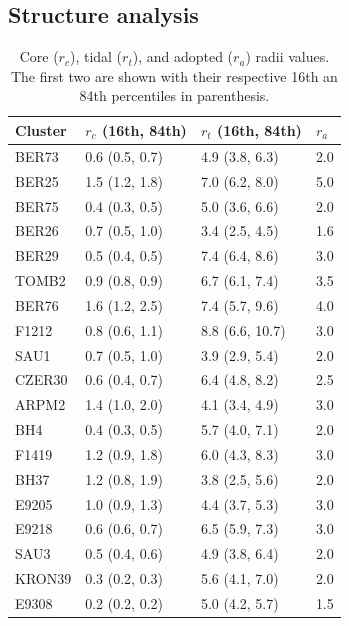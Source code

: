 \documentclass[draft]{aa}
\begin{document}
\begin{appendix}
\section{Structure analysis}
\label{app:struct_analysis}


 \begin{table}
 \caption{Core ($r_{c}$), tidal ($r_{t}$), and adopted ($r_{a}$) radii values.
 The first two are shown with their respective 16th an 84th percentiles in
 parenthesis.}
 \label{tab:radii}
 \centering
 \begin{tabular}{llll}
 \hline\hline
 Cluster & $r_{c}$ (16th, 84th) &  $r_{t}$ (16th, 84th) & $r_{a}$\\
 \hline
  BER73         & 0.6 (0.5, 0.7) &  4.9 (3.8, 6.3) &  2.0\\
  BER25         & 1.5 (1.2, 1.8) &  7.0 (6.2, 8.0) &  5.0\\
  BER75         & 0.4 (0.3, 0.5) &  5.0 (3.6, 6.6) &  2.0\\
  BER26         & 0.7 (0.5, 1.0) &  3.4 (2.5, 4.5) &  1.6\\
  BER29         & 0.5 (0.4, 0.5) &  7.4 (6.4, 8.6) &  3.0\\
  TOMB2         & 0.9 (0.8, 0.9) &  6.7 (6.1, 7.4) &  3.5\\
  BER76         & 1.6 (1.2, 2.5) &  7.4 (5.7, 9.6) &  4.0\\
  F1212         & 0.8 (0.6, 1.1) &  8.8 (6.6, 10.7) & 3.0\\
  SAU1          & 0.7 (0.5, 1.0) &  3.9 (2.9, 5.4) &  2.0\\
  CZER30        & 0.6 (0.4, 0.7) &  6.4 (4.8, 8.2) &  2.5\\
  ARPM2         & 1.4 (1.0, 2.0) &  4.1 (3.4, 4.9) &  3.0\\
  BH4           & 0.4 (0.3, 0.5) &  5.7 (4.0, 7.1) &  2.0\\
  F1419         & 1.2 (0.9, 1.8) &  6.0 (4.3, 8.3) &  3.0\\
  BH37          & 1.2 (0.8, 1.9) &  3.8 (2.5, 5.6) &  2.0\\
  E9205         & 1.0 (0.9, 1.3) &  4.4 (3.7, 5.3) &  3.0\\
  E9218         & 0.6 (0.6, 0.7) &  6.5 (5.9, 7.3) &  3.0\\
  SAU3          & 0.5 (0.4, 0.6) &  4.9 (3.8, 6.4) &  2.0\\
  KRON39        & 0.3 (0.2, 0.3) &  5.6 (4.1, 7.0) &  2.0\\
  E9308         & 0.2 (0.2, 0.2) &  5.0 (4.2, 5.7) &  1.5\\

\end{tabular}
\end{table}
\end{appendix}
\end{document}
